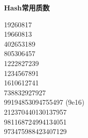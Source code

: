 \noindent\textbf{Hash常用质数}

19260817 \\
19660813 \\
402653189 \\
805306457 \\
1222827239 \\
1234567891 \\
1610612741 \\
738832927927 \\
99194853094755497 (9e16) \\
212370440130137957 \\
981168724994134051 \\
973475988423407129 \\
